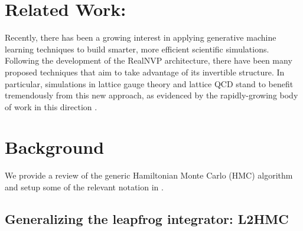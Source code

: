 \documentclass{article} %
\newcommand{\JCO}[1]{\textcolor{red}{[#1]}}
\begin{document}
\section{\label{sec:related_work}Related Work:}
Recently, there has been a growing interest in applying generative machine learning techniques to build smarter, more efficient scientific simulations.
%
%
%
Following the development of the RealNVP \citep{dinhRealNVP} architecture, there have been many proposed techniques that aim to take advantage of its invertible structure.
%
In particular, simulations in lattice gauge theory and lattice QCD stand to benefit tremendously from this new approach, as evidenced by the rapidly-growing body of work in this direction 
\citep{%
   albergo2019flow,albergo2021introduction,favoni2020lattice,medvidovic2020generative,neklyudov2020orbital,
   neklyudov2020involutive, li2020neural,boyda2020sampling,kanwar2020equivariant,toth2019hamiltonian,
   hoffman2019neutra,wehenkel2020you,pasarica2010adaptively, dinhRealNVP,tanaka2017towards,
   rezende2020normalizing%
}.

\section{\label{sec:background}Background}
We provide a review of the generic Hamiltonian Monte Carlo (HMC) algorithm and setup some of the relevant notation in
.
%
\subsection{\label{sec:l2hmc}Generalizing the leapfrog integrator: L2HMC}
%
%
%
\end{document}
